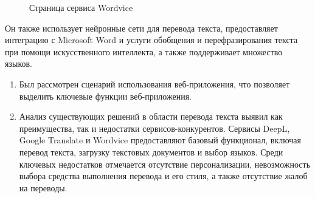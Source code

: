 \begin{figure}[H]
    \centering
    \caption{Страница сервиса Wordvice \label{img:wordvice}}
\end{figure}

Он также использует нейронные сети для перевода текста, предоставляет интеграцию с Microsoft Word и услуги обобщения и перефразирования текста при помощи искусственного интеллекта, а также поддерживает множество языков.


\begin{enumerate}
    \item Был рассмотрен сценарий использования веб-приложения, что позволяет выделить ключевые функции веб-приложения.
    \item Анализ существующих решений в области перевода текста выявил как преимущества, так и недостатки сервисов-конкурентов. Сервисы DeepL, Google Translate и Wordvice предоставляют базовый функционал, включая перевод текста, загрузку текстовых документов и выбор языков. Среди ключевых недостатков отмечается отсутствие персонализации, невозможность выбора средства выполнения перевода и его стиля, а также отсутствие жалоб на переводы.
\end{enumerate}
